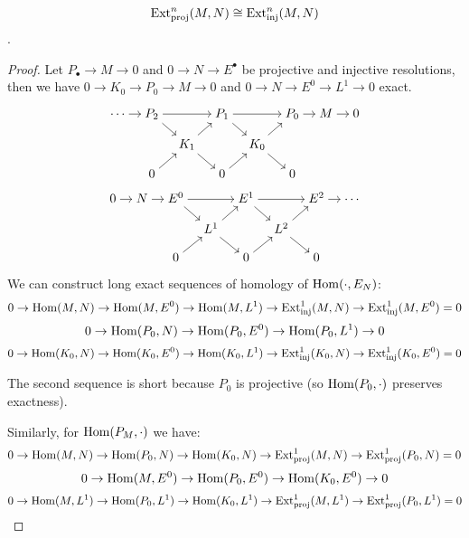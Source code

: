 \begin{theorem}
  $$\operatorname{Ext}_{\mathrm{proj}}^n(M, N) \cong \operatorname{Ext}_{\mathrm{inj}}^n(M, N)$$.

  \begin{proof}
    Let $P_\bullet \to M \to 0$ and $0 \to N \to E^\bullet$ be projective and 
    injective resolutions, then we have 
    $0 \to K_0 \to P_0 \to M \to 0$ and $0 \to N \to E^0 \to L^1 \to 0$ exact.

    \begin{minipage}{0.5\textwidth}
    $$
      \begin{tikzcd}[cramped, sep=10pt]
        \cdots \ar[r] & P_2 \ar[rr] \ar[rd] && P_1 \ar[rr] \ar[rd] && P_0 \ar[r] & M \ar[r] & 0 \\
                      & & K_1 \ar[ru] \ar[rd] && K_0 \ar[ru] \ar[rd] \\
                      & 0 \ar[ru] && 0 \ar[ru] && 0
      \end{tikzcd}
    $$
    \end{minipage}
    \begin{minipage}{0.5\textwidth}
    $$
      \begin{tikzcd}[cramped, sep=10pt]
        0 \ar[r] & N \ar[r] & E^0 \ar[rr] \ar[rd] && E^1 \ar[rr] \ar[rd] && E^2 \ar[r] & \cdots \\
                 &&& L^1 \ar[ru] \ar[rd] && L^2 \ar[ru] \ar[rd] \\
                 && 0 \ar[ru] && 0 \ar[ru] && 0
      \end{tikzcd}
    $$
    \end{minipage}

    \vspace{10pt}

    We can construct long exact sequences of homology of $\operatorname{Hom}(\cdot, E_N)$:
    $$0 \to \operatorname{Hom}(M, N) \to \operatorname{Hom}(M, E^0) \to \operatorname{Hom}(M, L^1) \to \operatorname{Ext}_{\mathrm{inj}}^1(M, N) \to \operatorname{Ext}_{\mathrm{inj}}^1(M, E^0) = 0$$
    $$0 \to \operatorname{Hom}(P_0, N) \to \operatorname{Hom}(P_0, E^0) \to \operatorname{Hom}(P_0, L^1) \to 0$$
    $$0 \to \operatorname{Hom}(K_0, N) \to \operatorname{Hom}(K_0, E^0) \to \operatorname{Hom}(K_0, L^1) \to \operatorname{Ext}_{\mathrm{inj}}^1(K_0, N) \to \operatorname{Ext}_{\mathrm{inj}}^1(K_0, E^0) = 0$$

    The second sequence is short because $P_0$ is projective (so $\operatorname{Hom}(P_0, \cdot)$ preserves exactness). 

    Similarly, for $\operatorname{Hom}(P_M, \cdot)$ we have:
    $$0 \to \operatorname{Hom}(M, N) \to \operatorname{Hom}(P_0, N) \to \operatorname{Hom}(K_0, N) \to \operatorname{Ext}_{\mathrm{proj}}^1(M, N) \to \operatorname{Ext}_{\mathrm{proj}}^1(P_0, N) = 0$$
    $$0 \to \operatorname{Hom}(M, E^0) \to \operatorname{Hom}(P_0, E^0) \to \operatorname{Hom}(K_0, E^0) \to 0$$
    $$0 \to \operatorname{Hom}(M, L^1) \to \operatorname{Hom}(P_0, L^1) \to \operatorname{Hom}(K_0, L^1) \to \operatorname{Ext}_{\mathrm{proj}}^1(M, L^1) \to \operatorname{Ext}_{\mathrm{proj}}^1(P_0, L^1) = 0$$


\end{proof}
\end{theorem}

